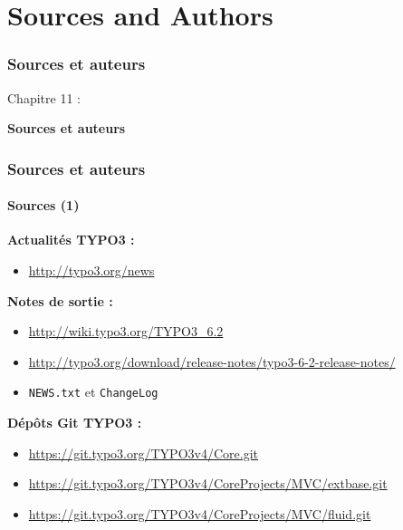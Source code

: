 %

\section{Sources and Authors}
\begin{frame}[fragile]
	\frametitle{Sources et auteurs}

	\begin{center}\huge{Chapitre 11 :}\end{center}
	\begin{center}\huge{\color{typo3darkgrey}\textbf{Sources et auteurs}}\end{center}

\end{frame}


\begin{frame}[fragile]
	\frametitle{Sources et auteurs}
	\framesubtitle{Sources (1)}

	\textbf{Actualités TYPO3 :}
		\begin{itemize}\smaller
			\item \url{http://typo3.org/news}
		\end{itemize}

	\textbf{Notes de sortie :}
		\begin{itemize}\smaller
			\item \url{http://wiki.typo3.org/TYPO3_6.2}
			\item \url{http://typo3.org/download/release-notes/typo3-6-2-release-notes/}
			\item \texttt{NEWS.txt} et \texttt{ChangeLog}
		\end{itemize}

	\textbf{Dépôts Git TYPO3 :}
		\begin{itemize}\smaller
			\item \url{https://git.typo3.org/TYPO3v4/Core.git}
			\item \url{https://git.typo3.org/TYPO3v4/CoreProjects/MVC/extbase.git}
			\item \url{https://git.typo3.org/TYPO3v4/CoreProjects/MVC/fluid.git}
		\end{itemize}

\end{frame}

